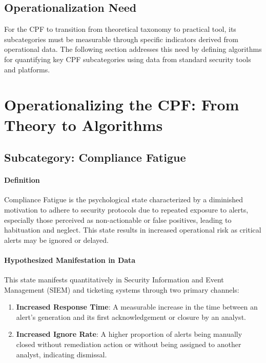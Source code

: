 \documentclass[11pt, a4paper]{article}
\begin{document}
\subsection{Operationalization Need}
For the CPF to transition from theoretical taxonomy to practical tool, its subcategories must be measurable through specific indicators derived from operational data. The following section addresses this need by defining algorithms for quantifying key CPF subcategories using data from standard security tools and platforms.

\section{Operationalizing the CPF: From Theory to Algorithms}
\label{sec:operationalization}

\subsection{Subcategory: Compliance Fatigue}
\label{subsec:compliance_fatigue}

\paragraph{Definition} Compliance Fatigue is the psychological state characterized by a diminished motivation to adhere to security protocols due to repeated exposure to alerts, especially those perceived as non-actionable or false positives, leading to habituation and neglect. This state results in increased operational risk as critical alerts may be ignored or delayed.

\paragraph{Hypothesized Manifestation in Data} This state manifests quantitatively in Security Information and Event Management (SIEM) and ticketing systems through two primary channels:
\begin{enumerate}
    \item \textbf{Increased Response Time}: A measurable increase in the time between an alert's generation and its first acknowledgement or closure by an analyst.
    \item \textbf{Increased Ignore Rate}: A higher proportion of alerts being manually closed without remediation action or without being assigned to another analyst, indicating dismissal.
\end{enumerate}
\end{document}
